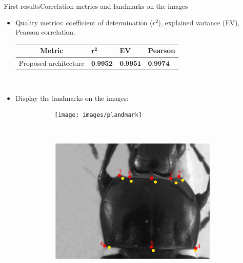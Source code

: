 \documentclass[10pt,svgnames]{beamer}
\begin{document}
\begin{frame}{First results}{Correlation metrics and landmarks on the images}
	\begin{itemize}
		\item Quality metrics: coefficient of determination ($r^2$), explained variance (EV), Pearson correlation.
			\begin{table}[htbp]
				\centering
				\begin{tabular}{|c|p{1cm}|p{1cm}|p{1.5cm}|}
					\hline
					Metric & $\mathbf{r^{2}}$ & \textbf{EV} & \textbf{Pearson} \\ \hline
					Proposed architecture & $\textbf{0.9952}$ & $\textbf{0.9951}$ & $\textbf{0.9974}$ \\ \hline
				\end{tabular}
			\end{table}~\\
	\item Display the landmarks on the images:
	\begin{figure}[htbp]
   				\begin{subfigure}[t]{0.5\textwidth}
        			\centering
        			\texttt{[image: images/plandmark]}
        			\caption{ }
        			\label{figsub11}
    			\end{subfigure}%
    			~ 
    			\begin{subfigure}[t]{0.5\textwidth}
        			\centering
        			\includegraphics[scale=.2]{images/plandmark2}
        			\caption{ }
        			\label{figsub22}
    			\end{subfigure} 
    		\end{figure}
   	\end{itemize}
\end{frame}
\end{document}
